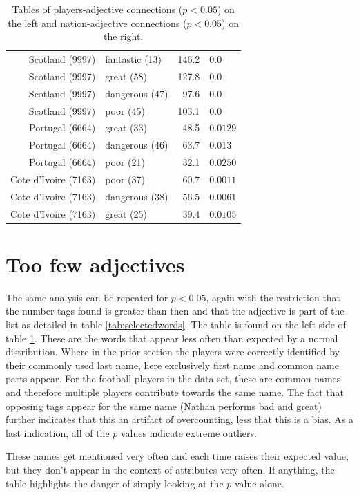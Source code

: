 \documentclass[10pt, a4paper]{UUThesisTemplate}
\begin{document}
\begin{table}
\begin{minipage}[t]{8cm}
\begin{tabular}{r l r l}
Scotland (9997) & fantastic (13) & 146.2 & $0.0$\\
Scotland (9997) & great (58) & 127.8 & $0.0$\\
Scotland (9997) & dangerous (47) & 97.6 & $0.0$\\
Scotland (9997) & poor (45) & 103.1 & $0.0$\\
Portugal (6664) & great (33) & 48.5 & $0.0129$\\
Portugal (6664) & dangerous (46) & 63.7 & $0.013$\\
Portugal (6664) & poor (21) & 32.1 & $0.0250$\\
Cote d'Ivoire (7163) & poor (37) & 60.7 & $0.0011$\\
Cote d'Ivoire (7163) & dangerous (38) & 56.5 & $0.0061$\\
Cote d'Ivoire (7163) & great (25) & 39.4 & $0.0105$\\\hline
\end{tabular}
\end{minipage}
\caption{Tables of players-adjective connections ($p<0.05$) on the left and nation-adjective connections ($p<0.05$) on the right.}\label{tab:ps0.05full}
\end{table}

\section{Too few adjectives}

The same analysis can be repeated for $p<0.05$, again with the restriction that the number tags found is greater than then and that the adjective is part of the list as detailed in table \ref{tab:selectedwords}. The table is found on the left side of table \ref{tab:ps0.05full}. These are the words that appear less often than expected by a normal distribution. Where in the prior section the players were correctly identified by their commonly used last name, here exclusively first name and common name parts appear. For the football players in the data set, these are common names and therefore multiple players contribute towards the same name. The fact that opposing tags appear for the same name (Nathan performs bad and great) further indicates that this an artifact of overcounting, less that this is a bias. As a last indication, all of the $p$ values indicate extreme outliers.

These names get mentioned very often and each time raises their expected value, but they don't appear in the context of attributes very often. If anything, the table highlights the danger of simply looking at the $p$ value alone.
\end{document}
